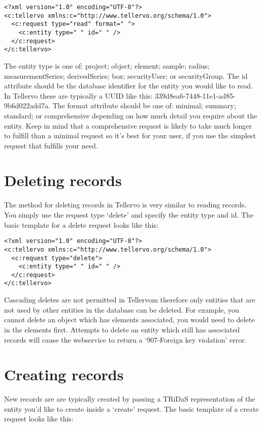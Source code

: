 \begin{lstlisting}
<?xml version="1.0" encoding="UTF-8"?>
<c:tellervo xmlns:c="http://www.tellervo.org/schema/1.0">
  <c:request type="read" format=" ">
    <c:entity type=" " id=" " />
  </c:request>
</c:tellervo>
\end{lstlisting}

The entity type is one of: project; object; element; sample; radius; measurementSeries; derivedSeries; box; securityUser; or securityGroup.  The id attribute should be the database identifier for the entity you would like to read.  In Tellervo these are typically a UUID like this: 339d8ea6-7448-11e1-ad85-9b6d022add7a.  The format attribute should be one of: minimal; summary; standard; or comprehensive depending on how much detail you require about the entity.  Keep in mind that a comprehensive request is likely to take much longer to fulfill than a minimal request so it's best for your user, if you use the simplest request that fulfills your need.


\section{Deleting records}

The method for deleting records in Tellervo is very similar to reading records.  You simply use the request type `delete' and specify the entity type and id.  The basic template for a delete request looks like this:

\begin{lstlisting}
<?xml version="1.0" encoding="UTF-8"?>
<c:tellervo xmlns:c="http://www.tellervo.org/schema/1.0">
  <c:request type="delete">
    <c:entity type=" " id=" " />
  </c:request>
</c:tellervo>
\end{lstlisting}

Cascading deletes are not permitted in Tellervom therefore only entities that are not used by other entities in the database can be deleted.  For example, you cannot delete an object which has elements associated, you would need to delete in the elements first.  Attempts to delete an entity which still has associated records will cause the webservice to return a `907-Foreign key violation' error.



\section{Creating records}

New records are are typically created by passing a TRiDaS representation of the entity you'd like to create inside a `create' request.  The basic template of a create request looks like this:


